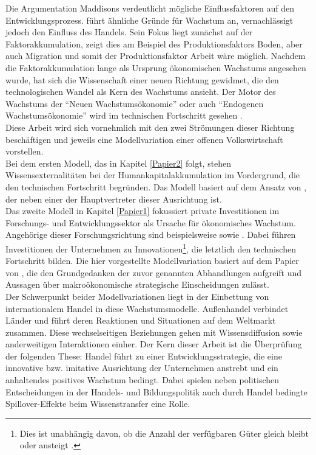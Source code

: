 %
Die Argumentation Maddisons verdeutlicht mögliche Einflussfaktoren auf den Entwicklungsprozess. \cite{Gandolfo.1998} führt ähnliche Gründe für Wachstum an, vernachlässigt jedoch den Einfluss des Handels. Sein Fokus liegt zunächst auf der Faktorakkumulation, \cite{Maddison.2001} zeigt dies am Beispiel des Produktionsfaktors Boden, aber auch Migration und somit der Produktionsfaktor Arbeit wäre möglich. Nachdem die Faktorakkumulation lange als Ursprung ökonomischen Wachstums angesehen wurde, hat sich die Wissenschaft einer neuen Richtung gewidmet, die den technologischen Wandel als Kern des Wachstums ansieht. Der Motor des Wachstums der "`Neuen Wachstumsökonomie"' oder auch "`Endogenen Wachstumsökonomie"' wird im technischen Fortschritt gesehen \cite[S. 27]{Gandolfo.1998,Maddison.2001}.\\
%
Diese Arbeit wird sich vornehmlich mit den zwei Strömungen dieser Richtung beschäftigen und jeweils eine Modellvariation einer offenen Volkswirtschaft vorstellen. \\
%
Bei dem ersten Modell, das in Kapitel \ref{Papier2} folgt, stehen Wissensexternalitäten bei der Humankapitalakkumulation im Vordergrund, die den technischen Fortschritt begründen. Das Modell basiert auf dem Ansatz von \cite{Lucas.1988}, der neben \cite{Romer.1990} einer der Hauptvertreter dieser Ausrichtung ist. \\
%
Das zweite Modell in Kapitel \ref{Papier1} fokussiert private Investitionen im Forschungs- und Entwicklungssektor als Ursache für ökonomisches Wachstum. Angehörige dieser Forschungsrichtung sind beispielsweise \cite{Romer.1990,Grossman.1991c} sowie \cite{Aghion.1992}. Dabei führen Investitionen der Unternehmen zu Innovationen\footnote{Dies ist unabhängig davon, ob die Anzahl der verfügbaren Güter gleich bleibt \cite{Aghion.1992} oder ansteigt \cite{Romer.1990}.}, die letztlich den technischen Fortschritt bilden. Die hier vorgestellte Modellvariation basiert auf dem Papier von \cite{Acemoglu.2006}, die den Grundgedanken der zuvor genannten Abhandlungen aufgreift und Aussagen über makroökonomische strategische Einscheidungen zulässt. \\
%
Der Schwerpunkt beider Modellvariationen liegt in der Einbettung von internationalem Handel in diese Wachstumsmodelle. Außenhandel verbindet Länder und führt deren Reaktionen und Situationen auf dem Weltmarkt zusammen. Diese wechselseitigen Beziehungen gehen mit Wissensdiffusion sowie anderweitigen Interaktionen einher. Der Kern dieser Arbeit ist die Überprüfung der folgenden These: Handel führt zu einer Entwicklungsstrategie, die eine innovative bzw. imitative Ausrichtung der Unternehmen anstrebt und ein anhaltendes positives Wachstum bedingt. Dabei spielen neben politischen Entscheidungen in der Handels- und Bildungspolitik auch durch Handel bedingte Spillover-Effekte beim Wissenstransfer eine Rolle.\\
